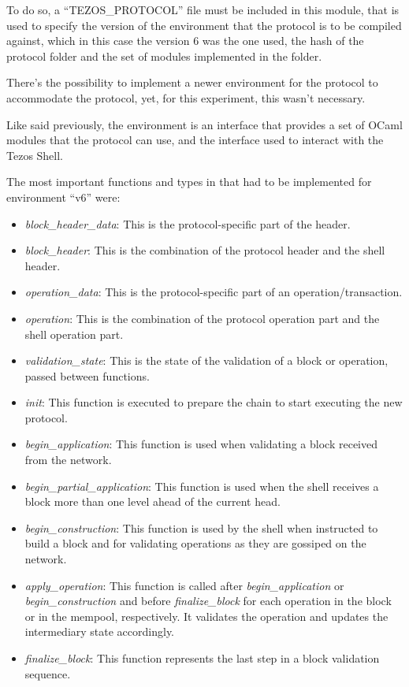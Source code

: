 To do so, a ``TEZOS\_PROTOCOL'' file must be included in this module, that is used to specify the version of the environment that the protocol is to be compiled against, which in this case the version 6 was the one used, the hash of the protocol folder and the set of modules implemented in the folder. 

There's the possibility to implement a newer environment for the protocol to accommodate the protocol, yet, for this experiment, this wasn't necessary. 

Like said previously, the environment is an interface that provides a set of OCaml modules that the protocol can use, and the interface used to interact with the Tezos Shell.

The most important functions and types in that had to be implemented for environment ``v6'' were:

\begin{itemize}
    \item \emph{block\_header\_data}: This is the protocol-specific part of the header.
    \item \emph{block\_header}: This is the combination of the protocol header and the shell header.
    \item \emph{operation\_data}: This is the protocol-specific part of an operation/transaction.
    \item \emph{operation}: This is the combination of the protocol operation part and the shell operation part.
    \item \emph{validation\_state}: This is the state of the validation of a block or operation, passed between functions.
    \item \emph{init}: This function is executed to prepare the chain to start executing the new protocol.
    \item \emph{begin\_application}: This function is used when validating a block received from the network.
    \item \emph{begin\_partial\_application}: This function is used when the shell receives a block more than one level ahead of the current head. 
    \item \emph{begin\_construction}: This function is used by the shell when instructed to build a block and for validating operations as they are gossiped on the network.
    \item \emph{apply\_operation}: This function is called after \emph{begin\_application} or \emph{begin\_construction} and before \emph{finalize\_block} for each operation in the block or in the mempool, respectively. It validates the operation and updates the intermediary state accordingly.
    \item \emph{finalize\_block}: This function represents the last step in a block validation sequence.
\end{itemize}

